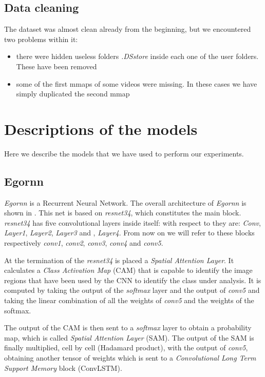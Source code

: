 \documentclass[10pt,twocolumn,hidelinks,letterpaper]{article}
\begin{document}
\subsection{Data cleaning}

The dataset was almost clean already from the beginning, but we encountered two problems within it:
\begin{itemize}
  \item there were hidden useless folders \textit{.DSstore} inside each one of the user folders. These have been removed
  \item some of the first mmaps of some videos were missing. In these cases we have simply duplicated the second mmap
\end{itemize}

\section{Descriptions of the models}

Here we describe the models that we have used to perform our experiments.

\subsection{Egornn}

\textit{Egornn} is a Recurrent Neural Network. The overall architecture of \textit{Egornn} is shown in . This net is based on \textit{resnet34}\cite{resnet}, which constitutes the main block. \textit{resnet34} has five convolutional layers inside itself: with respect to  they are: \textit{Conv}, \textit{Layer1}, \textit{Layer2}, \textit{Layer3} and , \textit{Layer4}. From now on we will refer to these blocks respectively \textit{conv1}, \textit{conv2}, \textit{conv3}, \textit{conv4} and \textit{conv5}.

At the termination of the \textit{resnet34} is placed a \textit{Spatial Attention Layer}. It calculates a \textit{Class Activation Map} (CAM) that is capable to identify the image regions that have been used by the CNN to identify the class under analysis. It is computed by taking the output of the \textit{softmax} layer and the output of \textit{conv5} and taking the linear combination of all the weights of \textit{conv5} and the weights of the softmax.


The output of the CAM is then sent to a \textit{softmax} layer to obtain a probability map, which is called \textit{Spatial Attention Layer} (SAM). The output of the SAM is finally multiplied, cell by cell (Hadamard product), with the output of \textit{conv5}, obtaining another tensor of weights which is sent to a \textit{Convolutional Long Term Support Memory} block (ConvLSTM).
\end{document}
